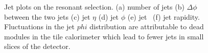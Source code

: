 \begin{figure}[htb]
  \caption{Jet plots on %
  the resonant selection. (a) number of jets (b) $\Delta\phi$ between the two jets (c) jet $\eta$
  (d) jet $\phi$ (e) jet \pt\ (f) jet rapidity.  Fluctuations in the jet $phi$ distribution are attributable to dead modules in the tile calorimeter which lead to fewer jets in small slices of the detector.}
 \label{fig:GGmonitoring5}
\end{figure}


